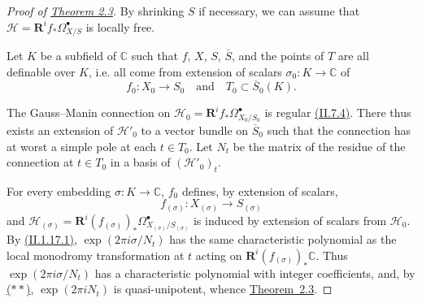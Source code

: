 \documentclass{report}
\newcommand{\scr}[1]{{\mathscr{#1}}}
\newcommand{\CC}{\mathbb{C}}
\newcommand{\RR}{\mathbf{R}}
\newcommand{\oldpage}[1]{\marginpar{\footnotesize$\Big\vert$ \textit{p.~#1}}}
\begin{document}
\begin{proof}[Proof of {\hyperref[III.2.3]{Theorem 2.3}}]
  By shrinking $S$ if necessary, we can assume that $\scr{H}=\RR^if_*\Omega_{X/S}^\bullet$ is locally free.

  Let $K$ be a subfield of $\CC$ such that $f$, $X$, $S$, $\overline{S}$, and the points of $T$ are all definable over $K$, i.e. all come from extension of scalars $\sigma_0\colon K\to\CC$ of
\oldpage{127}
  \[
    f_0\colon X_0\to S_0
    \quad\mbox{and}\quad
    T_0\subset\overline{S}_0(K).
  \]

  The Gauss--Manin connection on $\scr{H}_0=\RR^if_*\Omega_{X_0/S_0}^\bullet$ is regular \hyperref[II.7.4]{(II.7.4)}.
  There thus exists an extension of $\scr{H}'_0$ to a vector bundle on $\overline{S}_0$ such that the connection has at worst a simple pole at each $t\in T_0$.
  Let $N_t$ be the matrix of the residue of the connection at $t\in T_0$ in a basis of $(\scr{H}'_0)_t$.

  For every embedding $\sigma\colon K\to\CC$, $f_0$ defines, by extension of scalars,
  \[
    f_{(\sigma)}\colon X_{(\sigma)}\to S_{(\sigma)}
  \]
  and $\scr{H}_{(\sigma)}=\RR^i(f_{(\sigma)})_*\Omega_{X_{(\sigma)}/S_{(\sigma)}}^\bullet$ is induced by extension of scalars from $\scr{H}_0$.
  By \hyperref[II.1.17.1]{(II.1.17.1)}, $\exp(2\pi i\sigma/N_t)$ has the same characteristic polynomial as the local monodromy transformation at $t$ acting on $\RR^i(f_{(\sigma)})_*\CC$.
  Thus $\exp(2\pi i\sigma/N_t)$ has a characteristic polynomial with integer coefficients, and, by \hyperref[III.2.3.**]{($**$)}, $\exp(2\pi iN_t)$ is quasi-unipotent, whence \hyperref[III.2.3]{Theorem~2.3}.
\end{proof}





\nocite{*}
\end{document}
